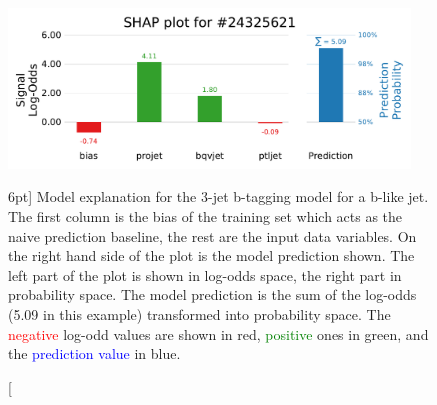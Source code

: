 \documentclass[a4paper, twoside]{tufte-book}
\begin{document}
\begin{figure}
  \includegraphics[width=0.95\textwidth, trim=0 0 0 40, clip]{figures/quarks/shap_values-down_sample=1.00-ML_vars=vertex-selection=b-ejet_min=4-n_iter_RS_lgb=99-n_iter_RS_xgb=9-cdot_cut=0.90-version=19-njet=3loc=24325621.pdf}
  \caption[SHAP Prediction Explanation for b-like jet][6pt]
          {Model explanation for the 3-jet b-tagging model for a b-like jet. The first column is the bias of the training set which acts as the naive prediction baseline, the rest are the input data variables. On the right hand side of the plot is the model prediction shown. The left part of the plot is shown in log-odds space, the right part in probability space. The model prediction is the sum of the log-odds (5.09 in this example) transformed into probability space. The \textcolor{red}{negative} log-odd values are shown in red, \textcolor{green}{positive} ones in green, and the \textcolor{blue}{prediction value} in blue. 
          } 
  \label{fig:q:shap_signal}
\end{figure}
\end{document}
